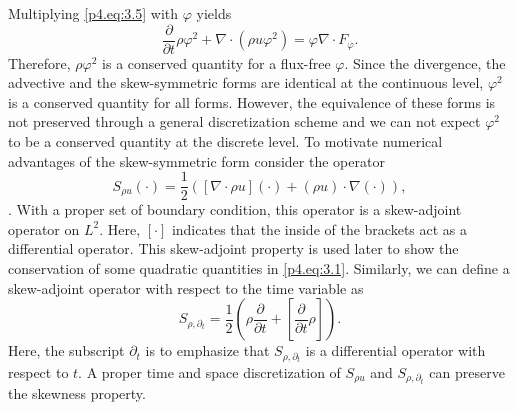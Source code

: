Multiplying \eqref{p4.eq:3.5} with $\varphi$ yields
\begin{equation}
	\frac{\partial }{\partial t} \rho \varphi^2 + \nabla \cdot ( \rho u \varphi^2  ) = \varphi \nabla \cdot F_{\varphi}.
\end{equation}
Therefore, $\rho \varphi^2$ is a conserved quantity for a flux-free $\varphi$. Since the divergence, the advective and the skew-symmetric forms are identical at the continuous level, $\varphi^2$ is a conserved quantity for all forms. However, the equivalence of these forms is not preserved through a general discretization scheme and we can not expect $\varphi^2$ to be a conserved quantity at the discrete level. To motivate numerical advantages of the skew-symmetric form consider the operator 
\begin{equation}
	S_{\rho u}(\cdot) = \frac 1 2 ( [ \nabla \cdot \rho u ](\cdot) + (\rho u)\cdot \nabla(\cdot) ),
\end{equation}
. With a proper set of boundary condition, this operator is a skew-adjoint operator on $L^2$. Here, $[\cdot]$ indicates that the inside of the brackets act as a differential operator. This skew-adjoint property is used later to show the conservation of some quadratic quantities in \eqref{p4.eq:3.1}. Similarly, we can define a skew-adjoint operator with respect to the time variable as
\begin{equation}
	S_{\rho,\partial_t} = \frac{1}{2} \left( \rho \frac{\partial}{\partial t} + [ \frac{\partial}{\partial t} \rho] \right).
\end{equation}
Here, the subscript $\partial_t$ is to emphasize that $S_{\rho,\partial_t}$ is a differential operator with respect to $t$. A proper time and space discretization of $S_{\rho u}$ and $S_{\rho,\partial_t}$ can preserve the skewness property.


